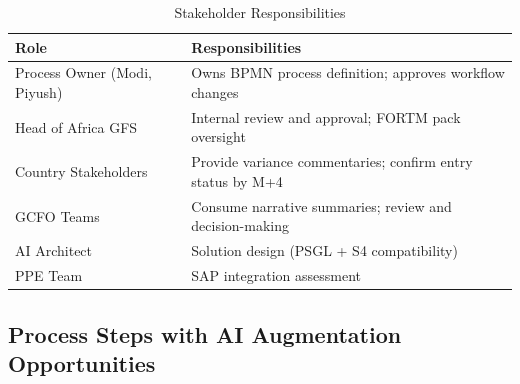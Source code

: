 \documentclass[11pt,a4paper]{article}
\begin{document}
\begin{table}[h]
\centering
\caption{Stakeholder Responsibilities}
\begin{tabular}{@{}L{5cm}L{9cm}@{}}
\toprule
\textbf{Role} & \textbf{Responsibilities} \\
\midrule
Process Owner (Modi, Piyush) & Owns BPMN process definition; approves workflow changes \\
Head of Africa GFS & Internal review and approval; FORTM pack oversight \\
Country Stakeholders & Provide variance commentaries; confirm entry status by M+4 \\
GCFO Teams & Consume narrative summaries; review and decision-making \\
AI Architect & Solution design (PSGL + S4 compatibility) \\
PPE Team & SAP integration assessment \\
\bottomrule
\end{tabular}
\end{table}

\subsection{Process Steps with AI Augmentation Opportunities}
\end{document}
